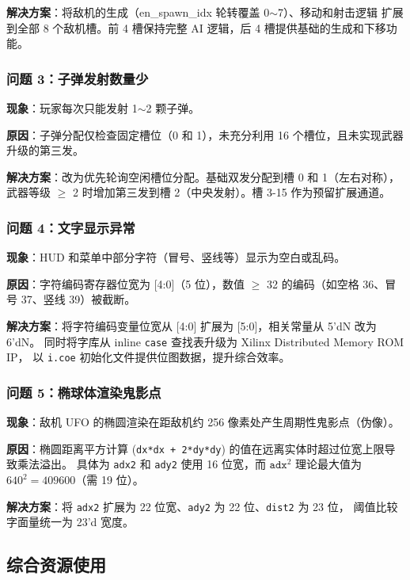 \documentclass[12pt,a4paper]{ctexart}
\begin{document}
\textbf{解决方案}：将敌机的生成（en\_spawn\_idx 轮转覆盖 0$\sim$7）、移动和射击逻辑
扩展到全部 8 个敌机槽。前 4 槽保持完整 AI 逻辑，后 4 槽提供基础的生成和下移功能。

\subsubsection{问题 3：子弹发射数量少}

\textbf{现象}：玩家每次只能发射 1$\sim$2 颗子弹。

\textbf{原因}：子弹分配仅检查固定槽位（0 和 1），未充分利用 16 个槽位，且未实现武器升级的第三发。

\textbf{解决方案}：改为优先轮询空闲槽位分配。基础双发分配到槽 0 和 1（左右对称），
武器等级 $\ge$ 2 时增加第三发到槽 2（中央发射）。槽 3-15 作为预留扩展通道。

\subsubsection{问题 4：文字显示异常}

\textbf{现象}：HUD 和菜单中部分字符（冒号、竖线等）显示为空白或乱码。

\textbf{原因}：字符编码寄存器位宽为 [4:0]（5 位），数值 $\ge$ 32 的编码（如空格 36、冒号 37、竖线 39）被截断。

\textbf{解决方案}：将字符编码变量位宽从 [4:0] 扩展为 [5:0]，相关常量从 5'dN 改为 6'dN。
同时将字库从 inline \texttt{case} 查找表升级为 Xilinx Distributed Memory ROM IP，
以 \texttt{i.coe} 初始化文件提供位图数据，提升综合效率。

\subsubsection{问题 5：椭球体渲染鬼影点}

\textbf{现象}：敌机 UFO 的椭圆渲染在距敌机约 256 像素处产生周期性鬼影点（伪像）。

\textbf{原因}：椭圆距离平方计算 (\texttt{dx*dx + 2*dy*dy}) 的值在远离实体时超过位宽上限导致乘法溢出。
具体为 \texttt{adx2} 和 \texttt{ady2} 使用 16 位宽，而 $\texttt{adx}^2$ 理论最大值为 $640^2 = 409600$（需 19 位）。

\textbf{解决方案}：将 \texttt{adx2} 扩展为 22 位宽、\texttt{ady2} 为 22 位、\texttt{dist2} 为 23 位，
阈值比较字面量统一为 23'd 宽度。

\subsection{综合资源使用}
\end{document}
